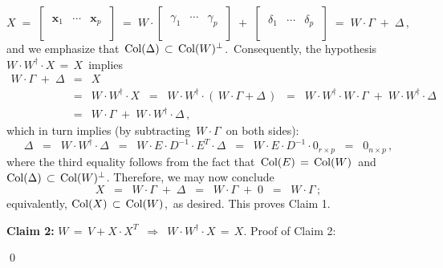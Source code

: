 \begin{enumerate}
\begin{equation*}
	X
	\;=\; \left[\;
		\begin{array}{ccc}
		\\
		\mathbf{x}_{1} & \cdots & \mathbf{x}_{p}
		\\
		\\
		\end{array}
		\;\right]
	\;=\;
		W \cdot \left[\;
			\begin{array}{ccc}
			\\
			\gamma_{1} & \cdots & \gamma_{p}
			\\
			\\
			\end{array}
			\;\right]
		\; + \;
			\left[\;
			\begin{array}{ccc}
			\\
			\delta_{1} & \cdots & \delta_{p}
			\\
			\\
			\end{array}
			\;\right]
	\;=\;
		W \cdot \Gamma \; + \; \Delta\,,
	\end{equation*}
	and we emphasize that \,$\textnormal{Col}(\Delta) \,\subset\, \textnormal{Col}(W)^{\perp}$.\,
	Consequently, the hypothesis \,$W \cdot W^{\dagger} \cdot X \,=\, X$\, implies
	\begin{eqnarray*}
	W \cdot \Gamma \;+\; \Delta
	&=& X
	\\
	&=& W \cdot W^{\dagger} \cdot X
	\;\;=\;\; W \cdot W^{\dagger} \cdot (\,W \cdot \Gamma + \Delta\,)
	\;\;=\;\; W \cdot W^{\dagger} \cdot W \cdot \Gamma \;+\; W \cdot W^{\dagger} \cdot \Delta
	\\
	&=& W \cdot \Gamma \;+\; W \cdot W^{\dagger} \cdot \Delta\,,
	\end{eqnarray*}
	which in turn implies (by subtracting \,$W \cdot \Gamma$\, on both sides):
	\begin{equation*}
	\Delta
	\;\; = \;\;
		W \cdot W^{\dagger} \cdot \Delta 
	\;\; = \;\;
		W \cdot E \cdot D^{-1} \cdot E^{T} \cdot \Delta 
	\;\; = \;\;
		W \cdot E \cdot D^{-1} \cdot 0_{r \times p}
	\;\; = \;\;
		0_{n \times p}\,,
	\end{equation*}
	where the third equality follows from the fact that
	\,$\textnormal{Col}(E) \,=\, \textnormal{Col}(W)$\, and \,$\textnormal{Col}(\Delta) \,\subset\, \textnormal{Col}(W)^{\perp}$.
	Therefore, we may now conclude
	\begin{equation*}
	X \;\; = \;\; W \cdot \Gamma \; + \; \Delta \;\; = \;\; W \cdot \Gamma \;+\; 0 \;\; = \;\; W \cdot \Gamma\,;
	\end{equation*}
	equivalently, $\textnormal{Col}(X) \,\subset\, \textnormal{Col}(W)$,\, as desired.
	This proves Claim 1.

	\vskip 0.5cm
	\noindent
	\textbf{Claim 2:}\quad
	$W \,=\, V + X \cdot X^{T}$
	\,\;$\Longrightarrow$\,\; $W \cdot W^{\dagger} \cdot X \,=\,X$.
	\vskip 0.0cm
	\noindent
	Proof of Claim 2:\quad

\end{enumerate}
\qed

